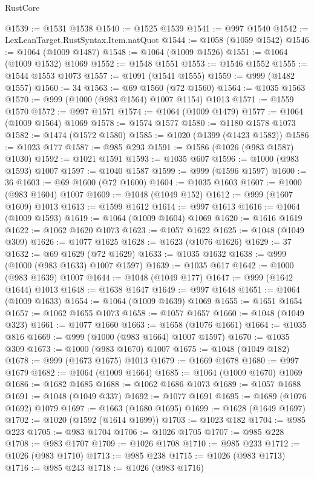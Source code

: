 \begin{lexlean}{RustCore}
\begin{coremodule}
@1539 := @1531 @1538
@1540 := @1525 @1539
@1541 := @997 @1540
@1542 := LexLeanTarget.RustSyntax.Item.natQuot
@1544 := @1058 (@1059 @1542)
@1546 := @1064 (@1009 @1487)
@1548 := @1064 (@1009 @1526)
@1551 := @1064 (@1009 @1532) @1069
@1552 := @1548 @1551
@1553 := @1546 @1552
@1555 := @1544 @1553 @1073
@1557 := @1091 (@1541 @1555)
@1559 := @999 (@1482 @1557)
@1560 := 34
@1563 := @69 @1560 (@72 @1560)
@1564 := @1035 @1563
@1570 := @999 (@1000 (@983 @1564) @1007 @1154) @1013
@1571 := @1559 @1570
@1572 := @997 @1571
@1574 := @1064 (@1009 @1479)
@1577 := @1064 (@1009 @1564) @1069
@1578 := @1574 @1577
@1580 := @1180 @1578 @1073
@1582 := @1474 (@1572 @1580)
@1585 := @1020 (@1399 (@1423 @1582))
@1586 := @1023 @177
@1587 := @985 @293
@1591 := @1586 (@1026 (@983 @1587) @1030)
@1592 := @1021 @1591
@1593 := @1035 @607
@1596 := @1000 (@983 @1593) @1007
@1597 := @1040 @1587
@1599 := @999 (@1596 @1597)
@1600 := 36
@1603 := @69 @1600 (@72 @1600)
@1604 := @1035 @1603
@1607 := @1000 (@983 @1604) @1007
@1609 := @1048 (@1049 @152)
@1612 := @999 (@1607 @1609) @1013
@1613 := @1599 @1612
@1614 := @997 @1613
@1616 := @1064 (@1009 @1593)
@1619 := @1064 (@1009 @1604) @1069
@1620 := @1616 @1619
@1622 := @1062 @1620 @1073
@1623 := @1057 @1622
@1625 := @1048 (@1049 @309)
@1626 := @1077 @1625
@1628 := @1623 (@1076 @1626)
@1629 := 37
@1632 := @69 @1629 (@72 @1629)
@1633 := @1035 @1632
@1638 := @999 (@1000 (@983 @1633) @1007 @1597)
@1639 := @1035 @617
@1642 := @1000 (@983 @1639) @1007
@1644 := @1048 (@1049 @177)
@1647 := @999 (@1642 @1644) @1013
@1648 := @1638 @1647
@1649 := @997 @1648
@1651 := @1064 (@1009 @1633)
@1654 := @1064 (@1009 @1639) @1069
@1655 := @1651 @1654
@1657 := @1062 @1655 @1073
@1658 := @1057 @1657
@1660 := @1048 (@1049 @323)
@1661 := @1077 @1660
@1663 := @1658 (@1076 @1661)
@1664 := @1035 @816
@1669 := @999 (@1000 (@983 @1664) @1007 @1597)
@1670 := @1035 @309
@1673 := @1000 (@983 @1670) @1007
@1675 := @1048 (@1049 @182)
@1678 := @999 (@1673 @1675) @1013
@1679 := @1669 @1678
@1680 := @997 @1679
@1682 := @1064 (@1009 @1664)
@1685 := @1064 (@1009 @1670) @1069
@1686 := @1682 @1685
@1688 := @1062 @1686 @1073
@1689 := @1057 @1688
@1691 := @1048 (@1049 @337)
@1692 := @1077 @1691
@1695 := @1689 (@1076 @1692) @1079
@1697 := @1663 (@1680 @1695)
@1699 := @1628 (@1649 @1697)
@1702 := @1020 (@1592 (@1614 @1699))
@1703 := @1023 @182
@1704 := @985 @223
@1705 := @983 @1704
@1706 := @1026 @1705
@1707 := @985 @228
@1708 := @983 @1707
@1709 := @1026 @1708
@1710 := @985 @233
@1712 := @1026 (@983 @1710)
@1713 := @985 @238
@1715 := @1026 (@983 @1713)
@1716 := @985 @243
@1718 := @1026 (@983 @1716)

\end{coremodule}
\end{lexlean}
